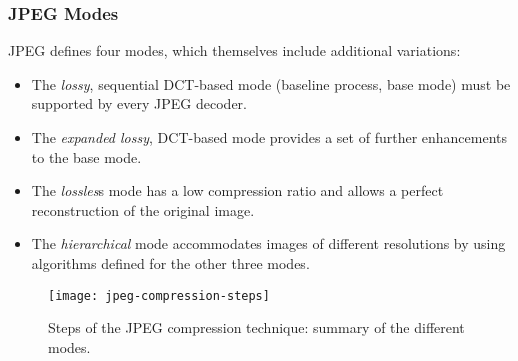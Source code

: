 \subsubsection*{JPEG Modes}
JPEG defines four modes, which themselves include additional variations:

\begin{itemize}
	\item The \textit{lossy}, sequential DCT-based mode (baseline process, base mode) must be
	supported by every JPEG decoder.
	\item The \textit{expanded lossy}, DCT-based mode provides a set of further enhancements to
	the base mode.
	\item The \textit{lossles}s mode has a low compression ratio and allows a perfect reconstruction
	of the original image.
	\item The \textit{hierarchical} mode accommodates images of different resolutions by using
	algorithms defined for the other three modes.
\end{itemize}

\begin{figure}[ht!]
	\centering
	\texttt{[image: jpeg-compression-steps]}
	\caption[Steps of the JPEG compression technique]{Steps of the JPEG compression technique: summary of the different modes.}{\label{fig:jpeg-compression-steps}}
\end{figure}



